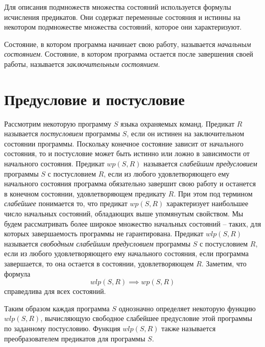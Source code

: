 Для описания подмножеств множества состояний используется формулы исчисления предикатов\cite{NovikovBook}. Они содержат
переменные состояния и истинны на некотором подмножестве множества состояний, которое они характеризуют.

Состояние, в котором программа начинает свою работу, называется \textit{начальным состоянием}. Состояние, 
в котором программа остается после завершения своей работы, называется \textit{заключительным состоянием}.



\section{Предусловие и постусловие}
Рассмотрим некоторую программу $S$ языка охраняемых команд. Предикат $R$ называется \textit{постусловием} программы $S$,
если он истинен на заключительном состоянии программы. Поскольку конечное состояние зависит от начального состояния, то 
и постусловие может быть истинно или ложно в зависимости от начального состояния. Предикат $wp(S, R)$ называется
\textit{слабейшим предусловием} программы $S$ с постусловием $R$, если из любого удовлетворяющего ему начального состояния
программа обязательно завершит свою работу и останется в конечном состоянии, удовлетворяющем предикату $R$. При этом
под термином \textit{слабейшее} понимается то, что предикат $wp(S, R)$ характеризует наибольшее число начальных состояний,
обладающих выше упомянутым свойством. Мы будем рассматривать более широкое множество начальных состояний 
-- таких, для которых завершаемость программы не гарантирована.
Предикат $wlp(S, R)$ называется
\textit{свободным слабейшим предусловием} программы $S$ с постусловием $R$, если из любого удовлетворяющего ему начального состояния,
если программа завершается, то она остается в состоянии, удовлетворяющем $R$. Заметим, что формула 
\begin{equation}
	wlp(S, R) \implies wp(S, R)
\end{equation}
справедлива для всех состояний.

Таким образом каждая программа $S$ однозначно определяет некоторую функцию $wlp(S, R)$,
вычисляющую свободное слабейшее предусловие этой программы по заданному постусловию. Функция $wlp(S, R)$ также
называется преобразователем предикатов для программы $S$.

